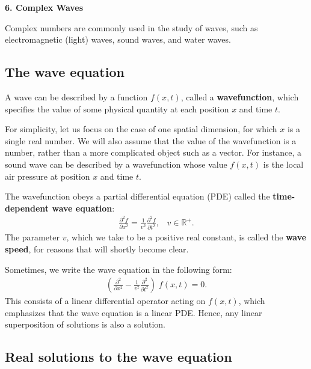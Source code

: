 \documentclass[10pt,a4paper]{article}
\begin{document}
\setcounter{page}{40}

\noindent
{\Large \textbf{6. Complex Waves}}
\vskip 0.2in
\label{complex-waves}

Complex numbers are commonly used in the study of waves, such as
electromagnetic (light) waves, sound waves, and water waves.

\subsection{The wave equation}
\label{the-wave-equation}

A wave can be described by a function $f(x,t)$, called a
\textbf{wavefunction}, which specifies the value of some physical
quantity at each position $x$ and time $t$.

For simplicity, let us focus on the case of one spatial dimension, for
which $x$ is a single real number. We will also assume that the value
of the wavefunction is a number, rather than a more complicated object
such as a vector. For instance, a sound wave can be described by a
wavefunction whose value $f(x,t)$ is the local air pressure at
position $x$ and time $t$.

The wavefunction obeys a partial differential equation (PDE) called
the \textbf{time-dependent wave equation}:
\begin{align}
  \frac{\partial^2 f}{\partial x^2} = \frac{1}{v^2} \frac{\partial^2 f}{\partial t^2}, \;\;\; v \in\mathbb{R}^+.
\end{align}
The parameter $v$, which we take to be a positive real constant, is
called the \textbf{wave speed}, for reasons that will shortly become
clear.

Sometimes, we write the wave equation in the following form:
\begin{align}
  \left(\frac{\partial^2}{\partial x^2} - \frac{1}{v^2} \frac{\partial^2}{\partial t^2}\right) \; f(x,t) = 0.
\end{align}
This consists of a linear differential operator acting on $f(x,t)$,
which emphasizes that the wave equation is a linear PDE. Hence, any
linear superposition of solutions is also a solution.

\subsection{Real solutions to the wave equation}
\label{real-solutions-to-the-wave-equation}
\end{document}
